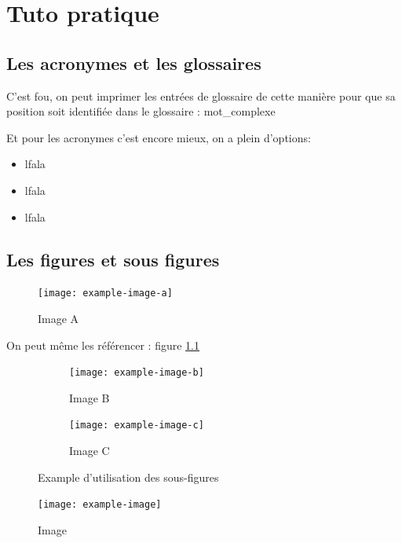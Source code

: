 \documentclass[a4paper,11pt]{report}    %
\begin{document}
\blindtext

\chapter{Tuto pratique}

\section{Les acronymes et les glossaires}

C'est fou, on peut imprimer les entrées de glossaire de cette manière pour que sa position soit identifiée dans le glossaire : \gls{mot_complexe}

Et pour les acronymes c'est encore mieux, on a plein d'options:
\begin{itemize}
    \item \acrshort{lfala}
        \item \acrlong{lfala}
    \item \acrfull{lfala}
\end{itemize}

\section{Les figures et sous figures}

\begin{figure}[H]
    \centering
    \texttt{[image: example-image-a]}
    \caption{Image A}
    \label{fig:example-image-a}
\end{figure}

On peut même les référencer : figure \ref{fig:example-image-a}

\begin{figure}[H]
    \begin{subfigure}[t]{0.475\textwidth}
        \texttt{[image: example-image-b]}
        \caption{Image B}
        \label{subfig:example-image-b}
    \end{subfigure}%
    \hfill
    \begin{subfigure}[t]{0.475\textwidth}
        \texttt{[image: example-image-c]}
        \caption{Image C}
        \label{subfig:example-image-c}
    \end{subfigure}
    \caption{Example d'utilisation des sous-figures}
    \label{fig:test_subfigure}
\end{figure}

\begin{figure}[H]
    \centering
    \texttt{[image: example-image]}
    \caption{Image}
    \label{fig:example-image}
\end{figure}
\end{document}

